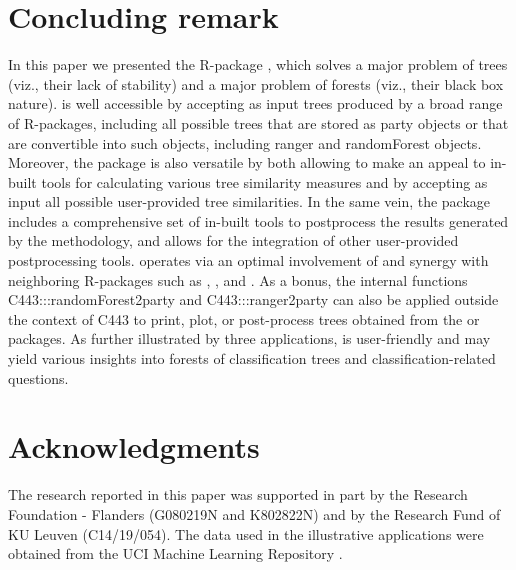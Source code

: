 \section{Concluding remark} \label{sec:summary}
In this paper we presented the R-package , which solves a major problem of trees (viz., their lack of stability) and a major problem of forests (viz., their black box nature).  is well accessible by accepting as input trees produced by a broad range of R-packages, including all possible trees that are stored as party objects or that are convertible into such objects, including ranger and randomForest objects. Moreover, the package is also versatile by both allowing to make an appeal to in-built tools for calculating various tree similarity measures and by accepting as input all possible user-provided tree similarities. In the same vein, the package includes a comprehensive set of in-built tools to postprocess the 
results generated by the methodology, and allows for the integration of other user-provided postprocessing tools.  operates via an optimal involvement of and synergy with neighboring R-packages such as ,  ,   and . As a bonus, the internal functions C443:::randomForest2party and C443:::ranger2party can also be applied outside the context of C443 to print, plot, or post-process trees obtained from the   or  packages.
As further illustrated by three applications,  is user-friendly and may yield various insights into forests of classification trees and classification-related questions.%



\section*{Acknowledgments}
The research reported in this paper was supported in part by the Research Foundation - Flanders (G080219N and K802822N) and by the Research Fund of KU Leuven (C14/19/054). The data used in the illustrative applications were obtained from the UCI Machine Learning Repository \citep{Dheeru2017,Fehrman2017}.

